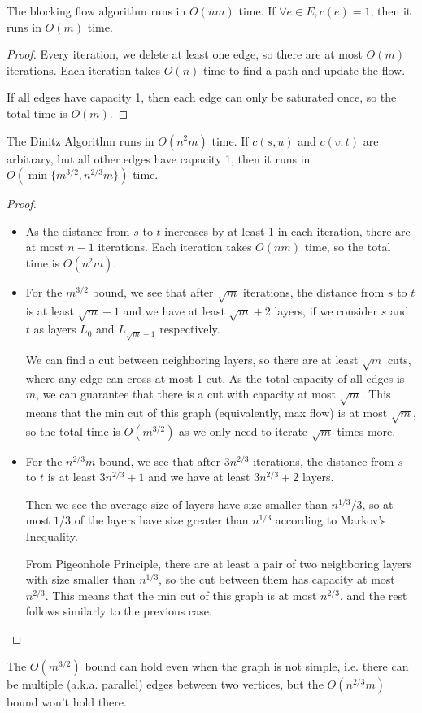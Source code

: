 \begin{lemma}
	The blocking flow algorithm runs in $O(nm)$ time. If $\forall e\in E, c(e) =1$, then it runs in $O(m)$ time.
\end{lemma}
\begin{proof}
	Every iteration, we delete at least one edge, so there are at most $O(m)$ iterations. Each iteration takes $O(n)$ time to find a path and update the flow.

	If all edges have capacity 1, then each edge can only be saturated once, so the total time is $O(m)$.
\end{proof}

\begin{theorem}
	The Dinitz Algorithm runs in $O(n^2 m)$ time. If $c(s,u)$ and $c(v,t)$ are arbitrary, but all other edges have capacity 1, then it runs in $O(\min\{m^{3/2}, n^{2/3} m\})$ time.
\end{theorem}
\begin{proof}
	\begin{itemize}
		\item	As the distance from $s$ to $t$ increases by at least 1 in each iteration, there are at most $n-1$ iterations. Each iteration takes $O(nm)$ time, so the total time is $O(n^2 m)$.

		\item For the $m^{3/2}$ bound, we see that after $\sqrt{m}$ iterations, the distance from $s$ to $t$ is at least $\sqrt{m}+1$ and we have at least $\sqrt{m}+2$ layers, if we consider $s$ and $t$ as layers $L_0$ and $L_{\sqrt{m}+1}$ respectively.

		      We can find a cut between neighboring layers, so there are at least $\sqrt{m}$ cuts, where any edge can cross at most 1 cut. As the total capacity of all edges is $m$, we can guarantee that there is a cut with capacity at most $\sqrt{m}$. This means that the min cut of this graph (equivalently, max flow) is at most $\sqrt{m}$, so the total time is $O(m^{3/2})$ as we only need to iterate $\sqrt{m}$ times more.

		\item For the $n^{2/3} m$ bound, we see that after $3n^{2/3}$ iterations, the distance from $s$ to $t$ is at least $3n^{2/3}+1$ and we have at least $3n^{2/3}+2$ layers.

		      Then we see the average size of layers have size smaller than $n^{1/3}/3$, so at most $1/3$ of the layers have size greater than $n^{1/3}$ according to Markov's Inequality.

		      From Pigeonhole Principle, there are at least a pair of two neighboring layers with size smaller than $n^{1/3}$, so the cut between them has capacity at most $n^{2/3}$. This means that the min cut of this graph is at most $n^{2/3}$, and the rest follows similarly to the previous case.
	\end{itemize}
\end{proof}
\begin{remark}
	The $O(m^{3/2})$ bound can hold even when the graph is not simple, i.e. there can be multiple (a.k.a. parallel) edges between two vertices, but the $O(n^{2/3} m)$ bound won't hold there.
\end{remark}

